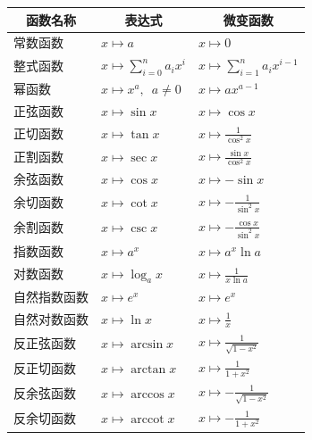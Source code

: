 \documentclass[12pt,UTF8]{ctexbook}
\newcommand{\arccot}{\operatorname{arccot}}
\begin{document}
\begin{appendix}
\begin{center}
    \renewcommand{\arraystretch}{2}
    \setlength{\extrarowheight}{-3pt}
    \begin{longtable}{|l|l|l|}
        \hline \multicolumn{1}{|c|}{\textbf{函数名称}} & \multicolumn{1}{c|}{\textbf{表达式}} & \multicolumn{1}{c|}{\textbf{微变函数}} \\ 
        \hline         
        常数函数 & $x\mapsto a$ & $x\mapsto 0$ \\  
        \hline
        整式函数 & $x\mapsto \sum_{i=0}^n a_i x^i$ & $x\mapsto \sum_{i=1}^n a_i x^{i-1}$ \\ 
        \hline
        幂函数 & $x\mapsto x^a, \,\,\, a\neq 0$ & $x\mapsto ax^{a-1}$ \\ 
        \hline
        正弦函数 & $x\mapsto \sin{x}$ & $x\mapsto \cos{x}$ \\ 
        \hline
        正切函数 & $x\mapsto \tan{x}$ & $x\mapsto \frac{1}{\cos^2{x}}$ \\
        \hline
        正割函数 & $x\mapsto \sec{x}$ & $x\mapsto \frac{\sin{x}}{\cos^2{x}}$ \\ 
        \hline
        余弦函数 & $x\mapsto \cos{x}$ & $x\mapsto -\sin{x}$ \\ 
        \hline
        余切函数 & $x\mapsto \cot{x}$ & $x\mapsto -\frac{1}{\sin^2{x}}$ \\ 
        \hline
        余割函数 & $x\mapsto \csc{x}$ & $x\mapsto -\frac{\cos{x}}{\sin^2{x}}$ \\
        \hline
        指数函数 & $x\mapsto a^x$ & $x\mapsto a^x \ln{a} $ \\ 
        \hline
        对数函数 & $x\mapsto \log_a{x}$ & $x\mapsto \frac{1}{x\ln{a}} $ \\
        \hline
        自然指数函数 & $x\mapsto e^x$ & $x\mapsto e^x $ \\ 
        \hline
        自然对数函数 & $x\mapsto \ln{x}$ & $x\mapsto \frac{1}{x} $ \\  
        \hline
        反正弦函数 & $x\mapsto \arcsin{x}$ & $x\mapsto \frac{1}{\sqrt{1 - x^2}}$ \\ 
        \hline
        反正切函数 & $x\mapsto \arctan{x}$ & $x\mapsto \frac{1}{1 + x^2}$ \\
        \hline
        反余弦函数 & $x\mapsto \arccos{x}$ & $x\mapsto -\frac{1}{\sqrt{1 - x^2}}$ \\ 
        \hline
        反余切函数 & $x\mapsto \arccot{x}$ & $x\mapsto -\frac{1}{1 + x^2}$ \\ 
        \hline
    \end{longtable}
\end{center}


\end{appendix}
\end{document}
